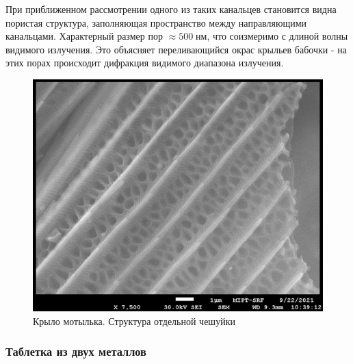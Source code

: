 \documentclass[a4paper,12pt]{article}
\theoremstyle{plain} %
\theoremstyle{definition} %
\theoremstyle{remark} %
\newcommand{\s}[0]{
	\;	
}
\newcommand{\picref}[1]{
	\text{рис(\ref{#1})}
}
\begin{document}
При приближенном рассмотрении одного из таких канальцев \picref{pic5} становится видна пористая структура, заполняющая пространство между направляющими канальцами. Характерный размер пор $ \approx 500\s нм $, что соизмеримо с длиной волны видимого излучения. Это объясняет переливающийся окрас крыльев бабочки - на этих порах происходит дифракция видимого диапазона излучения.
\begin{figure}[h!]
	\centering
	\includegraphics[scale=1.3]{pic5.jpg}
	\caption{Крыло мотылька. Структура отдельной чешуйки}
	\label{pic5}
\end{figure}
\subsubsection{Таблетка из двух металлов}
\end{document}
